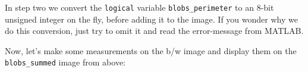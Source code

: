 In step two we convert the \lstinline{logical} variable \lstinline{blobs_perimeter} to an 8-bit unsigned integer on the fly, before adding it to the image. If you wonder why we do this conversion, just try to omit it and read the error-message from MATLAB.

Now, let's make some measurements on the b/w image and display them on the \lstinline{blobs_summed} image from above: